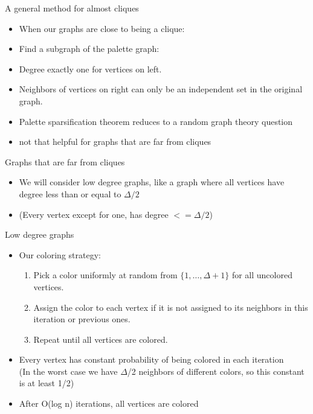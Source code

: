 \documentclass[aspectratio=169,xcolor=dvipsnames]{beamer}
\begin{document}
	\begin{frame}{A general method for almost cliques}
		\begin{itemize}
			\item When our graphs are close to being a clique:
			\newline
			\item Find a subgraph of the palette graph:
			\item Degree exactly one for vertices on left.
			\item Neighbors of vertices on right can only be an independent set in the original graph.
			\item Palette sparsification theorem reduces to a random graph theory question
			\newline
			\item \alert{ not that helpful for graphs that are far from cliques }
		\end{itemize}
		
	\end{frame}
	
	\begin{frame}{Graphs that are far from cliques}
		\begin{itemize}
			\item We will consider low degree graphs, like a  graph where all vertices have degree less than or equal to $ \Delta/2$
			\item (Every vertex except for one, has degree $<= \Delta/2$)
			
		\end{itemize}
		
	\end{frame}
	
	\begin{frame}{Low degree graphs}
		\begin{itemize}
			\item Our coloring strategy:
			\newline
			\begin{enumerate}
				\item Pick a color uniformly at random from $\{1, \ldots, \Delta + 1\}$ for all uncolored vertices.
				\item Assign the color to each vertex if it is not assigned to its neighbors in this iteration or previous ones.
				\item Repeat until all vertices are colored.
			\end{enumerate}
			\item Every vertex has constant probability of being colored in each iteration \\(In the worst case we have $\Delta$/2 neighbors of different colors, so this constant is at least 1/2)
			\item After O(log n) iterations, all vertices are colored
			
		\end{itemize}
		
	\end{frame}
	
\end{document}
